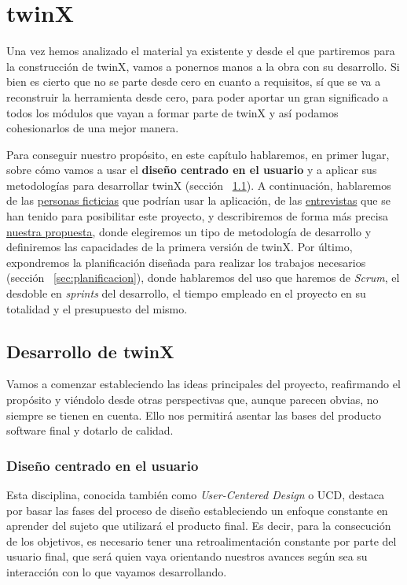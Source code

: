 \chapter{twinX}

Una vez hemos analizado el material ya existente y desde el que partiremos para la construcción de twinX, vamos a ponernos manos a la obra con su desarrollo. Si bien es cierto que no se parte desde cero en cuanto a requisitos, sí que se va a reconstruir la herramienta desde cero, para poder aportar un gran significado a todos los módulos que vayan a formar parte de twinX y así podamos cohesionarlos de una mejor manera.

Para conseguir nuestro propósito, en este capítulo hablaremos, en primer lugar, sobre cómo vamos a usar el \textbf{diseño centrado en el usuario} y a aplicar sus metodologías para desarrollar twinX (sección ~\ref{sec:desarrollo}). A continuación, hablaremos de las \hyperref[sec:personas]{personas ficticias} que podrían usar la aplicación, de las \hyperref[sec:entrevistas]{entrevistas} que se han tenido para posibilitar este proyecto, y describiremos de forma más precisa \hyperref[sec:propuesta]{nuestra propuesta}, donde elegiremos un tipo de metodología de desarrollo y definiremos las capacidades de la primera versión de twinX. Por último, expondremos la planificación diseñada para realizar los trabajos necesarios (sección ~\ref{sec:planificacion}), donde hablaremos del uso que haremos de \textit{Scrum}, el desdoble en \textit{sprints} del desarrollo, el tiempo empleado en el proyecto en su totalidad y el presupuesto del mismo.

\section{Desarrollo de twinX}
\label{sec:desarrollo}
Vamos a comenzar estableciendo las ideas principales del proyecto, reafirmando el propósito y viéndolo desde otras perspectivas que, aunque parecen obvias, no siempre se tienen en cuenta. Ello nos permitirá asentar las bases del producto software final y dotarlo de calidad. 

\subsection{Diseño centrado en el usuario}

Esta disciplina, conocida también como \textit{User-Centered Design} o UCD, destaca por basar las fases del proceso de diseño estableciendo un enfoque constante en aprender del sujeto que utilizará el producto final. Es decir, para la consecución de los objetivos, es necesario tener una retroalimentación constante por parte del usuario final, que será quien vaya orientando nuestros avances según sea su interacción con lo que vayamos desarrollando.

